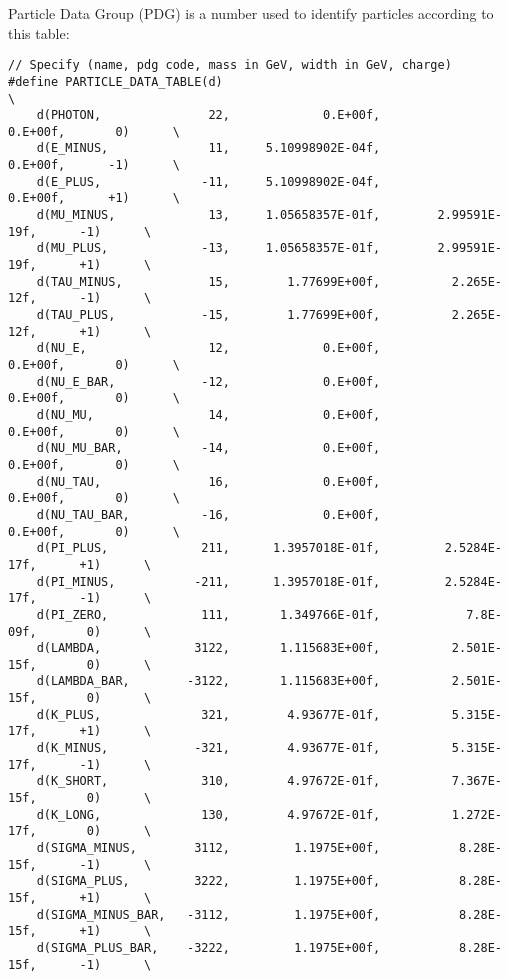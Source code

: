 Particle Data Group (PDG) is a number used to identify particles according to this table:
\begin{verbatim}
// Specify (name, pdg code, mass in GeV, width in GeV, charge)
#define PARTICLE_DATA_TABLE(d)                                                          \
    d(PHOTON,               22,             0.E+00f,             0.E+00f,       0)      \
    d(E_MINUS,              11,     5.10998902E-04f,             0.E+00f,      -1)      \
    d(E_PLUS,              -11,     5.10998902E-04f,             0.E+00f,      +1)      \
    d(MU_MINUS,             13,     1.05658357E-01f,        2.99591E-19f,      -1)      \
    d(MU_PLUS,             -13,     1.05658357E-01f,        2.99591E-19f,      +1)      \
    d(TAU_MINUS,            15,        1.77699E+00f,          2.265E-12f,      -1)      \
    d(TAU_PLUS,            -15,        1.77699E+00f,          2.265E-12f,      +1)      \
    d(NU_E,                 12,             0.E+00f,             0.E+00f,       0)      \
    d(NU_E_BAR,            -12,             0.E+00f,             0.E+00f,       0)      \
    d(NU_MU,                14,             0.E+00f,             0.E+00f,       0)      \
    d(NU_MU_BAR,           -14,             0.E+00f,             0.E+00f,       0)      \
    d(NU_TAU,               16,             0.E+00f,             0.E+00f,       0)      \
    d(NU_TAU_BAR,          -16,             0.E+00f,             0.E+00f,       0)      \
    d(PI_PLUS,             211,      1.3957018E-01f,         2.5284E-17f,      +1)      \
    d(PI_MINUS,           -211,      1.3957018E-01f,         2.5284E-17f,      -1)      \
    d(PI_ZERO,             111,       1.349766E-01f,            7.8E-09f,       0)      \
    d(LAMBDA,             3122,       1.115683E+00f,          2.501E-15f,       0)      \
    d(LAMBDA_BAR,        -3122,       1.115683E+00f,          2.501E-15f,       0)      \
    d(K_PLUS,              321,        4.93677E-01f,          5.315E-17f,      +1)      \
    d(K_MINUS,            -321,        4.93677E-01f,          5.315E-17f,      -1)      \
    d(K_SHORT,             310,        4.97672E-01f,          7.367E-15f,       0)      \
    d(K_LONG,              130,        4.97672E-01f,          1.272E-17f,       0)      \
    d(SIGMA_MINUS,        3112,         1.1975E+00f,           8.28E-15f,      -1)      \
    d(SIGMA_PLUS,         3222,         1.1975E+00f,           8.28E-15f,      +1)      \
    d(SIGMA_MINUS_BAR,   -3112,         1.1975E+00f,           8.28E-15f,      +1)      \
    d(SIGMA_PLUS_BAR,    -3222,         1.1975E+00f,           8.28E-15f,      -1)      \

\end{verbatim}
